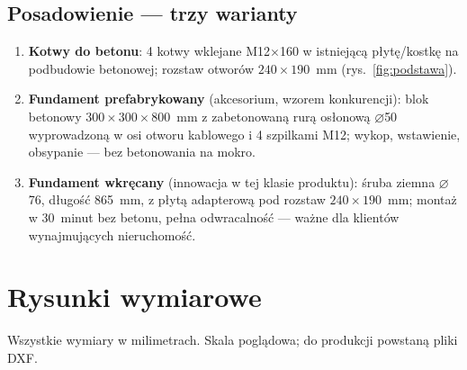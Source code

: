 \documentclass[11pt,a4paper]{article}
\begin{document}
\subsection{Posadowienie --- trzy warianty}
\begin{enumerate}
\item \textbf{Kotwy do betonu}: 4 kotwy wklejane M12$\times$160 w istniejącą płytę/kostkę na podbudowie
betonowej; rozstaw otworów $240\times190$~mm (rys.~\ref{fig:podstawa}).
\item \textbf{Fundament prefabrykowany} (akcesorium, wzorem konkurencji): blok betonowy
$300\times300\times800$~mm z zabetonowaną rurą osłonową $\varnothing$50 wyprowadzoną w osi otworu
kablowego i 4 szpilkami M12; wykop, wstawienie, obsypanie --- bez betonowania na mokro.
\item \textbf{Fundament wkręcany} (innowacja w tej klasie produktu): śruba ziemna $\varnothing$76,
długość 865~mm, z płytą adapterową pod rozstaw $240\times190$~mm; montaż w 30~minut bez betonu,
pełna odwracalność --- ważne dla klientów wynajmujących nieruchomość.
\end{enumerate}

\section{Rysunki wymiarowe}
Wszystkie wymiary w milimetrach. Skala poglądowa; do produkcji powstaną pliki DXF.
\end{document}

